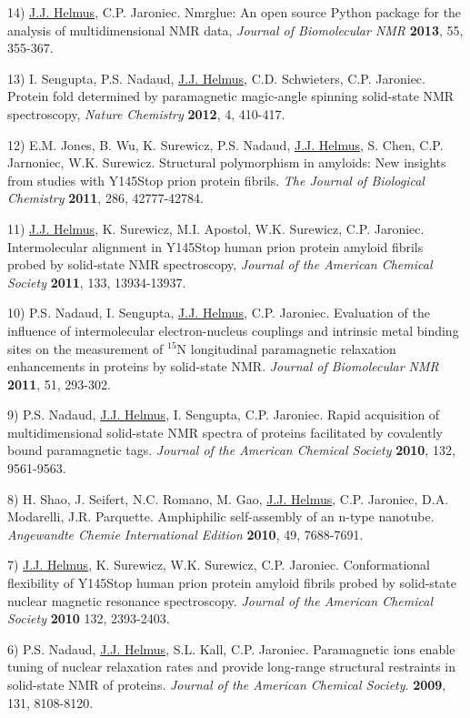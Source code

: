 \documentclass[margin,line]{res}
\begin{document}
\begin{resume}
14) \underline{J.J. Helmus}, C.P. Jaroniec.
Nmrglue: An open source Python package for the analysis of multidimensional NMR data,
{\em Journal of Biomolecular NMR} {\bf 2013}, 55, 355-367.

13) I. Sengupta, P.S. Nadaud, \underline{J.J. Helmus}, C.D. Schwieters, C.P. Jaroniec.
Protein fold determined by paramagnetic magic-angle spinning solid-state NMR spectroscopy,
{\em Nature Chemistry} {\bf 2012}, 4, 410-417.

12) E.M. Jones, B. Wu, K. Surewicz, P.S. Nadaud, \underline{J.J. Helmus}, S. Chen,
C.P. Jarnoniec, W.K. Surewicz.
Structural polymorphism in amyloids: New insights from studies with Y145Stop prion protein fibrils.
{\em The Journal of Biological Chemistry} {\bf 2011}, 286, 42777-42784.

11) \underline{J.J. Helmus}, K. Surewicz, M.I. Apostol, W.K. Surewicz, C.P. Jaroniec.
Intermolecular alignment in Y145Stop human prion protein amyloid fibrils probed by solid-state
NMR spectroscopy,
{\em Journal of the American Chemical Society} {\bf 2011}, 133, 13934-13937.

10) P.S. Nadaud, I. Sengupta, \underline{J.J. Helmus}, C.P. Jaroniec.
Evaluation of the influence of intermolecular electron-nucleus couplings and intrinsic metal
binding sites on the measurement of $^{15}$N longitudinal paramagnetic relaxation enhancements
in proteins by solid-state NMR.
{\em Journal of Biomolecular NMR} {\bf 2011}, 51, 293-302.

9) P.S. Nadaud, \underline{J.J. Helmus}, I. Sengupta, C.P. Jaroniec.
Rapid acquisition of multidimensional solid-state NMR spectra of proteins facilitated by
covalently bound paramagnetic tags.
{\em Journal of the American Chemical Society} {\bf 2010}, 132, 9561-9563.

8) H. Shao, J. Seifert, N.C. Romano, M. Gao, \underline{J.J. Helmus}, C.P. Jaroniec,
D.A. Modarelli, J.R. Parquette.
Amphiphilic self-assembly of an n-type nanotube.
{\em Angewandte Chemie International Edition} {\bf 2010}, 49, 7688-7691.

7) \underline{J.J. Helmus}, K. Surewicz, W.K. Surewicz, C.P. Jaroniec.
Conformational flexibility of Y145Stop human prion protein amyloid fibrils probed by
solid-state nuclear magnetic resonance spectroscopy.
{\em Journal of the American Chemical Society} {\bf 2010} 132, 2393-2403.

6) P.S. Nadaud, \underline{J.J. Helmus}, S.L. Kall, C.P. Jaroniec.
Paramagnetic ions enable tuning of nuclear relaxation rates and provide long-range structural
restraints in solid-state NMR of proteins.
{\em Journal of the American Chemical Society}. {\bf 2009}, 131, 8108-8120.


\end{resume}
\end{document}

